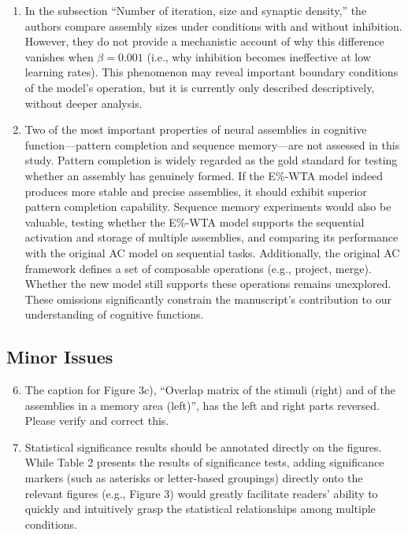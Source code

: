 \documentclass[a4paper, 11pt]{article}
\begin{document}
\begin{enumerate}
    \item In the subsection ``Number of iteration, size and synaptic density,'' the authors compare assembly sizes under conditions with and without inhibition. However, they do not provide a mechanistic account of why this difference vanishes when $\beta = 0.001$ (i.e., why inhibition becomes ineffective at low learning rates). This phenomenon may reveal important boundary conditions of the model's operation, but it is currently only described descriptively, without deeper analysis.
    
    \item Two of the most important properties of neural assemblies in cognitive function---pattern completion and sequence memory---are not assessed in this study. Pattern completion is widely regarded as the gold standard for testing whether an assembly has genuinely formed. If the E\%-WTA model indeed produces more stable and precise assemblies, it should exhibit superior pattern completion capability. Sequence memory experiments would also be valuable, testing whether the E\%-WTA model supports the sequential activation and storage of multiple assemblies, and comparing its performance with the original AC model on sequential tasks. Additionally, the original AC framework defines a set of composable operations (e.g., project, merge). Whether the new model still supports these operations remains unexplored. These omissions significantly constrain the manuscript's contribution to our understanding of cognitive functions.
\end{enumerate}

\subsection*{Minor Issues}
\begin{enumerate}
    \setcounter{enumi}{5}
    \item The caption for Figure 3c), ``Overlap matrix of the stimuli (right) and of the assemblies in a memory area (left)'', has the left and right parts reversed. Please verify and correct this.
    
    \item Statistical significance results should be annotated directly on the figures. While Table 2 presents the results of significance tests, adding significance markers (such as asterisks or letter-based groupings) directly onto the relevant figures (e.g., Figure 3) would greatly facilitate readers' ability to quickly and intuitively grasp the statistical relationships among multiple conditions.
\end{enumerate}
\end{document}
